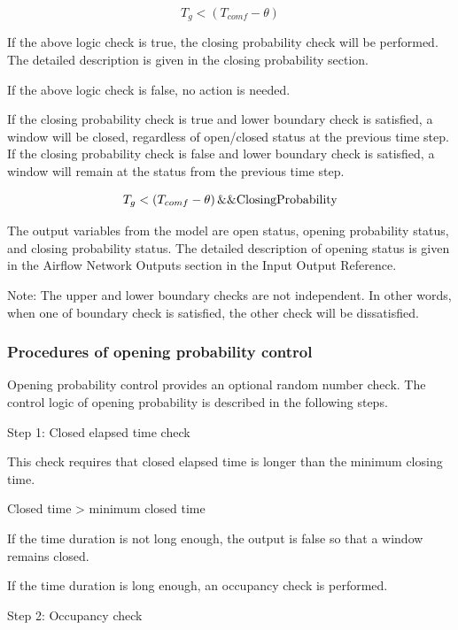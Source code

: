 \begin{equation}
T_g < \left(T_{comf} - \theta\right)
\end{equation}

If the above logic check is true, the closing probability check will be performed. The detailed description is given in the closing probability section.

If the above logic check is false, no action is needed.

If the closing probability check is true and lower boundary check is satisfied, a window will be closed, regardless of open/closed status at the previous time step. If the closing probability check is false and lower boundary check is satisfied, a window will remain at the status from the previous time step.

\begin{equation}
T_g < \left(T_{comf} - \theta\right) \&\& \rm{ClosingProbability}
\end{equation}

The output variables from the model are open status, opening probability status, and closing probability status. The detailed description of opening status is given in the Airflow Network Outputs section in the Input Output Reference.

Note: The upper and lower boundary checks are not independent. In other words, when one of boundary check is satisfied, the other check will be dissatisfied.

\subsubsection{Procedures of opening probability control}\label{procedures-of-opening-probability-control}

Opening probability control provides an optional random number check. The control logic of opening probability is described in the following steps.

Step 1: Closed elapsed time check

This check requires that closed elapsed time is longer than the minimum closing time.

Closed time \textgreater{} minimum closed time

If the time duration is not long enough, the output is false so that a window remains closed.

If the time duration is long enough, an occupancy check is performed.

Step 2: Occupancy check

